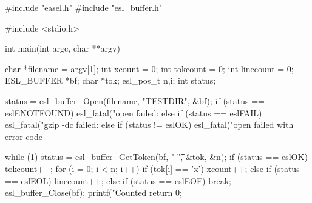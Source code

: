 \begin{cchunk}
#include "easel.h"
#include "esl_buffer.h"

#include <stdio.h>

int main(int argc, char **argv)
{
  char       *filename = argv[1];
  int         xcount    = 0;
  int         tokcount  = 0;
  int         linecount = 0;
  ESL_BUFFER *bf;
  char       *tok;
  esl_pos_t   n,i;
  int         status;

  status = esl_buffer_Open(filename, "TESTDIR", &bf);
  if      (status == eslENOTFOUND) esl_fatal("open failed: %
  else if (status == eslFAIL)      esl_fatal("gzip -dc failed: %
  else if (status != eslOK)        esl_fatal("open failed with error code %
  
  while (1) 
    {
      status = esl_buffer_GetToken(bf, " \t", &tok, &n);
      if      (status == eslOK)  
	{
	  tokcount++;  
	  for (i = 0; i < n; i++)
	    if (tok[i] == 'x') xcount++;
	}
      else if (status == eslEOL) linecount++;
      else if (status == eslEOF) break;
    }
  esl_buffer_Close(bf);
  printf("Counted %
  return 0;
}
\end{cchunk}
